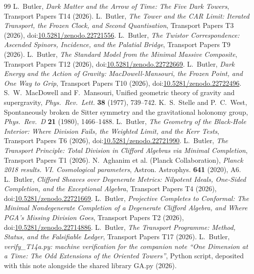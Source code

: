 \documentclass[11pt]{article}
\theoremstyle{definition}
\theoremstyle{plain}
\begin{document}
\begin{thebibliography}{99}
 L.~Butler,
\emph{Dark Matter and the Arrow of Time: The Five Dark Towers},
Transport Papers T14 (2026).
 L.~Butler,
\emph{The Tower and the CAR Limit: Iterated Transport, the Frozen Clock, and Second Quantisation},
Transport Papers T3 (2026), doi:\href{https://doi.org/10.5281/zenodo.22721556}{10.5281/zenodo.22721556}.
 L.~Butler,
\emph{The Twistor Correspondence: Ascended Spinors, Incidence, and the Palatial Bridge},
Transport Papers T9 (2026).
 L.~Butler,
\emph{The Standard Model from the Minimal Massive Composite},
Transport Papers T12 (2026), doi:\href{https://doi.org/10.5281/zenodo.22722669}{10.5281/zenodo.22722669}.
 L.~Butler,
\emph{Dark Energy and the Action of Gravity: MacDowell-Mansouri, the Frozen Point, and One Way to Grip},
Transport Papers T10 (2026), doi:\href{https://doi.org/10.5281/zenodo.22722496}{10.5281/zenodo.22722496}.
 S.~W.~MacDowell and F.~Mansouri,
Unified geometric theory of gravity and supergravity,
\emph{Phys.\ Rev.\ Lett.} \textbf{38} (1977), 739--742.
 K.~S.~Stelle and P.~C.~West,
Spontaneously broken de Sitter symmetry and the gravitational holonomy group,
\emph{Phys.\ Rev.\ D} \textbf{21} (1980), 1466--1488.
 L.~Butler,
\emph{The Geometry of the Black-Hole Interior: Where Division Fails, the Weighted Limit, and the Kerr Tests},
Transport Papers T6 (2026), doi:\href{https://doi.org/10.5281/zenodo.22721990}{10.5281/zenodo.22721990}.
 L.~Butler,
\emph{The Transport Principle: Total Division in Clifford Algebras via Minimal Completion},
Transport Papers T1 (2026).
 N.~Aghanim et al. (Planck Collaboration),
\emph{Planck 2018 results. VI. Cosmological parameters},
Astron. Astrophys. \textbf{641} (2020), A6.
 L.~Butler,
\emph{Clifford Sheaves over Degenerate Metrics: Nilpotent Ideals, One-Sided Completion, and the Exceptional Algebra},
Transport Papers T4 (2026), doi:\href{https://doi.org/10.5281/zenodo.22721669}{10.5281/zenodo.22721669}.
 L.~Butler,
\emph{Projective Completes to Conformal: The Minimal Nondegenerate Completion of a Degenerate Clifford Algebra, and Where PGA's Missing Division Goes},
Transport Papers T2 (2026), doi:\href{https://doi.org/10.5281/zenodo.22714886}{10.5281/zenodo.22714886}.
 L.~Butler,
\emph{The Transport Programme: Method, Status, and the Falsifiable Ledger},
Transport Papers T17 (2026).
 L.~Butler,
\emph{verify\_T14a.py: machine verification for the companion note ``One Dimension at a Time: The Odd Extensions of the Oriented Towers''},
Python script, deposited with this note alongside the shared library GA.py (2026).
\end{thebibliography}
\end{document}
